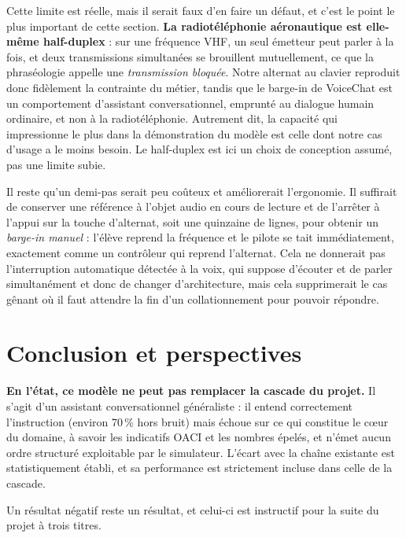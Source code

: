 \documentclass[11pt,a4paper]{article}
\begin{document}
Cette limite est réelle, mais il serait faux d'en faire un défaut, et c'est le
point le plus important de cette section. \textbf{La radiotéléphonie
aéronautique est elle-même half-duplex} : sur une fréquence VHF, un seul
émetteur peut parler à la fois, et deux transmissions simultanées se brouillent
mutuellement, ce que la phraséologie appelle une \emph{transmission bloquée}.
Notre alternat au clavier reproduit donc fidèlement la contrainte du métier,
tandis que le barge-in de VoiceChat est un comportement d'assistant
conversationnel, emprunté au dialogue humain ordinaire, et non à la
radiotéléphonie. Autrement dit, la capacité qui impressionne le plus dans la
démonstration du modèle est celle dont notre cas d'usage a le moins besoin. Le
half-duplex est ici un choix de conception assumé, pas une limite subie.

Il reste qu'un demi-pas serait peu coûteux et améliorerait l'ergonomie. Il
suffirait de conserver une référence à l'objet audio en cours de lecture et de
l'arrêter à l'appui sur la touche d'alternat, soit une quinzaine de lignes, pour
obtenir un \emph{barge-in manuel} : l'élève reprend la fréquence et le pilote se
tait immédiatement, exactement comme un contrôleur qui reprend l'alternat. Cela
ne donnerait pas l'interruption automatique détectée à la voix, qui suppose
d'écouter et de parler simultanément et donc de changer d'architecture, mais
cela supprimerait le cas gênant où il faut attendre la fin d'un collationnement
pour pouvoir répondre.

\section{Conclusion et perspectives}

\textbf{En l'état, ce modèle ne peut pas remplacer la cascade du projet.} Il
s'agit d'un assistant conversationnel généraliste : il entend correctement
l'instruction (environ 70\,\% hors bruit) mais échoue sur ce qui constitue le
cœur du domaine, à savoir les indicatifs OACI et les nombres épelés, et n'émet aucun
ordre structuré exploitable par le simulateur. L'écart avec la chaîne existante
est statistiquement établi, et sa performance est strictement incluse dans celle
de la cascade.

Un résultat négatif reste un résultat, et celui-ci est instructif pour la suite
du projet à trois titres.
\end{document}
